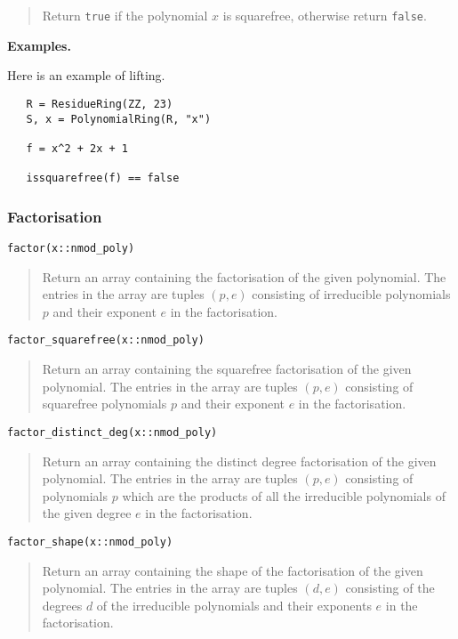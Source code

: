 \documentclass[a4paper,10pt]{article}
\newcommand{\code}{\lstinline}
\newcommand{\desc}[1]{\vspace{-3mm}\begin{quote}#1\end{quote}}
\begin{document}
{{\desc{Return \code{true} if the polynomial $x$ is squarefree, otherwise return \code{false}.}

\textbf{Examples.}

Here is an example of lifting.

\begin{lstlisting}
   R = ResidueRing(ZZ, 23)
   S, x = PolynomialRing(R, "x")

   f = x^2 + 2x + 1

   issquarefree(f) == false
\end{lstlisting}

\subsubsection{Factorisation}

\begin{lstlisting}
factor(x::nmod_poly)
\end{lstlisting}

\desc{Return an array containing the factorisation of the given polynomial. The entries in
the array are tuples $(p, e)$ consisting of irreducible polynomials $p$ and their exponent
$e$ in the factorisation.}

\begin{lstlisting}
factor_squarefree(x::nmod_poly)
\end{lstlisting}

\desc{Return an array containing the squarefree factorisation of the given polynomial. The
entries in the array are tuples $(p, e)$ consisting of squarefree polynomials $p$ and their
exponent $e$ in the factorisation.}

\begin{lstlisting}
factor_distinct_deg(x::nmod_poly)
\end{lstlisting}

\desc{Return an array containing the distinct degree factorisation of the given polynomial.
The entries in the array are tuples $(p, e)$ consisting of polynomials $p$ which are the
products of all the irreducible polynomials of the given degree $e$ in the factorisation.}

\begin{lstlisting}
factor_shape(x::nmod_poly)
\end{lstlisting}

\desc{Return an array containing the shape of the factorisation of the given polynomial.
The entries in the array are tuples $(d, e)$ consisting of the degrees $d$ of the
irreducible polynomials and their exponents $e$ in the factorisation.}

}}
\end{document}
